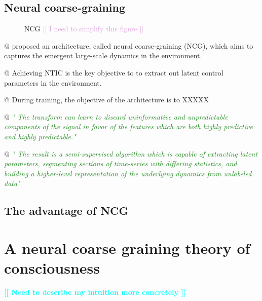 \documentclass[utf8]{article}
\makeatletter
\newenvironment{ants}
			{
			 \begin{easylist}[itemize]		
		 	}
			{
			\end{easylist}
			}
\newcommand{\rewrite}[1]{\textcolor{ForestGreen}{\textit{"#1"}}\newline}
\newcommand{\includegraphicsTodo}[2][]{%
			\tcbox[%
				adjusted title=\LARGE To Be Modified,
				halign title=right,
				colbacktitle=Orange!75!White,
				coltitle=Black,
				colframe=Red!60!White,
				boxrule=1mm,
				colback=white%
				]{\texttt{[image: \#2]}}}
\newcommand{\idea}[2][Plum]{\noindent
				\textcolor{#1}{[[ #2 ]]}}
\newcommand{\toWrite}[1]{\noindent
			\textcolor{Cyan}{\textbf{[[ #1 ]]}}}
\newcommand{\martin}[1]{\todo[color=SpringGreen]{@Martin:\\#1}}
\makeatother
\begin{document}
		
		
			
		\subsection{\martin{todo}Neural coarse-graining}
			\begin{figure}
				\includegraphicsTodo[width=0.8\textwidth]{WritingMaterials/PDFXCview_2018-06-08_14-24-03.png}
				\caption{NCG \idea{I need to simplify this figure}\citep{guttenberg2016neural}}
				\label{fig:NCG}				
			\end{figure}
			
		
		
			\begin{ants}
				@ \citep{guttenberg2016neural} proposed an architecture, called neural coarse-graining (NCG), which aims to captures the emergent large-scale dynamics in the environment. 
				
				@ Achieving NTIC is the key objective to to extract out latent control parameters in the environment.
				
				@ During training, the objective of the architecture is to XXXXX\martin{todo}
				
				 
				@ \rewrite{
					The transform can learn to discard uninformative and unpredictable components of the signal in favor of the features which are both highly predictive and highly predictable.}\citep{guttenberg2016neural}
							
				
				
				@ \rewrite{
					The result is a semi-supervised algorithm which is capable of extracting latent parameters, segmenting sections of time-series with diﬀering statistics, and building a higher-level representation of the underlying dynamics from unlabeled data}\citep{guttenberg2016neural}
				
			\end{ants}
		
		
		
			
		\subsection{The advantage of NCG}

			

	\section{A neural coarse graining theory of consciousness}
		\toWrite{Need to describe my intuition more concretely }
		
\end{document}
